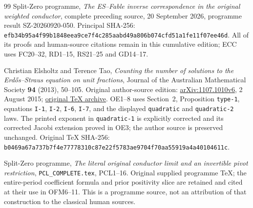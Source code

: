 \documentclass[11pt]{article}
\begin{document}
\begin{thebibliography}{99}
 Split-Zero programme,
\emph{The ES--Fable inverse correspondence in the original weighted
conductor}, complete preceding source, 20 September 2026,
programme result SZ-20260920-050. Principal SHA-256:
\texttt{efb34b95a4f99b1848eea9ce7f4c285aabd49a806b074cfd51a1fe11f07ee46d}.
All of its proofs and human-source citations remain in this cumulative
edition; ECC uses FC20--32, RD1--15, RS21--25 and GD14--17.


 Christian Elsholtz and Terence Tao,
\emph{Counting the number of solutions to the Erd\H{o}s--Straus
equation on unit fractions}, Journal of the Australian Mathematical
Society \textbf{94} (2013), 50--105. Original author-source edition:
\href{https://arxiv.org/abs/1107.1010v6}{arXiv:1107.1010v6},
2 August 2015; \href{https://arxiv.org/src/1107.1010v6}{original TeX archive}.
OE1--8 uses Section~2, Proposition \texttt{type-1}, equations
\texttt{I-1}, \texttt{I-2}, \texttt{I-6}, \texttt{I-7},
and the displayed \texttt{quadratic} and \texttt{quadratic-2} laws.
The printed exponent in \texttt{quadratic-1} is explicitly corrected
and its corrected Jacobi extension proved in OE3; the author source
is preserved unchanged. Original TeX SHA-256:
\texttt{b0469a67a737b7f4e77778310c87e22f5783ae9704f70aa55919a4a40104611c}.


 Split-Zero programme,
\emph{The literal original conductor limit and an invertible pivot restriction},
\texttt{PCL\_COMPLETE.tex}, PCL1--16. Original supplied programme TeX;
the entire-period coefficient formula and prior positivity slice are
retained and cited at their use in OFM6--11. This is a programme source,
not an attribution of that construction to the classical human sources.

\end{thebibliography}
\end{document}

